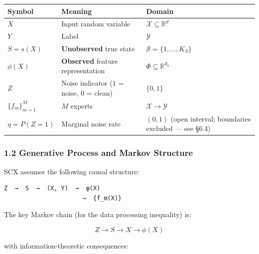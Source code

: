 \documentclass[
  12pt,
]{ctexart}
\begin{document}
\begin{longtable}[]{@{}
  >{\raggedright\arraybackslash}p{}
  >{\raggedright\arraybackslash}p{}
  >{\raggedright\arraybackslash}p{}@{}}
\toprule\noalign{}
\begin{minipage}[b]{\linewidth}\raggedright
Symbol
\end{minipage} & \begin{minipage}[b]{\linewidth}\raggedright
Meaning
\end{minipage} & \begin{minipage}[b]{\linewidth}\raggedright
Domain
\end{minipage} \\
\midrule\noalign{}
\endhead
\bottomrule\noalign{}
\endlastfoot
\(X\) & Input random variable &
\(\mathcal{X} \subseteq \mathbb{R}^d\) \\
\(Y\) & Label & \(\mathcal{Y}\) \\
\(S = s(X)\) & \textbf{Unobserved} true state &
\(\mathcal{S} = \{1,\dots,K_S\}\) \\
\(\phi(X)\) & \textbf{Observed} feature representation &
\(\Phi \subseteq \mathbb{R}^{d_\phi}\) \\
\(Z\) & Noise indicator (\(1\) = noise, \(0\) = clean) & \(\{0,1\}\) \\
\(\{f_m\}_{m=1}^M\) & \(M\) experts & \(\mathcal{X} \to \mathcal{Y}\) \\
\(\eta = P(Z = 1)\) & Marginal noise rate & \((0,1)\) (open interval;
boundaries excluded --- see §6.4) \\
\end{longtable}

\subsubsection{1.2 Generative Process and Markov
Structure}\label{generative-process-and-markov-structure}

SCX assumes the following causal structure:

\begin{verbatim}
Z  →  S  →  (X, Y)  →  φ(X)
                      →  {f_m(X)}
\end{verbatim}

The key Markov chain (for the data processing inequality) is:

\[Z \to S \to X \to \phi(X)\]

with information-theoretic consequences:
\end{document}
